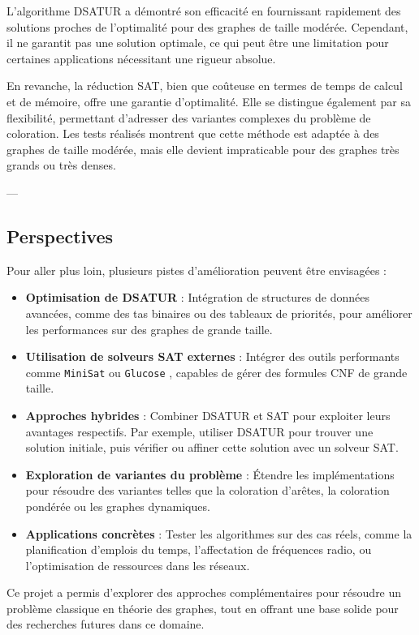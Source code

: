 \documentclass[11pt]{article}
\begin{document}
L'algorithme DSATUR a démontré son efficacité en fournissant rapidement des solutions proches de l'optimalité pour des graphes de taille modérée. Cependant, il ne garantit pas une solution optimale, ce qui peut être une limitation pour certaines applications nécessitant une rigueur absolue.

En revanche, la réduction SAT, bien que coûteuse en termes de temps de calcul et de mémoire, offre une garantie d'optimalité. Elle se distingue également par sa flexibilité, permettant d'adresser des variantes complexes du problème de coloration. Les tests réalisés montrent que cette méthode est adaptée à des graphes de taille modérée, mais elle devient impraticable pour des graphes très grands ou très denses.

---

\subsection{Perspectives}

Pour aller plus loin, plusieurs pistes d'amélioration peuvent être envisagées :
\begin{itemize}
    \item \textbf{Optimisation de DSATUR} : Intégration de structures de données avancées, comme des tas binaires ou des tableaux de priorités, pour améliorer les performances sur des graphes de grande taille.
    \item \textbf{Utilisation de solveurs SAT externes} : Intégrer des outils performants comme \texttt{MiniSat} ou \texttt{Glucose} \cite{sat_glucose} , capables de gérer des formules CNF de grande taille.
    \item \textbf{Approches hybrides} : Combiner DSATUR et SAT pour exploiter leurs avantages respectifs. Par exemple, utiliser DSATUR pour trouver une solution initiale, puis vérifier ou affiner cette solution avec un solveur SAT.
    \item \textbf{Exploration de variantes du problème} : Étendre les implémentations pour résoudre des variantes telles que la coloration d'arêtes, la coloration pondérée ou les graphes dynamiques.
    \item \textbf{Applications concrètes} : Tester les algorithmes sur des cas réels, comme la planification d'emplois du temps, l'affectation de fréquences radio, ou l'optimisation de ressources dans les réseaux.
\end{itemize}

Ce projet a permis d'explorer des approches complémentaires pour résoudre un problème classique en théorie des graphes, tout en offrant une base solide pour des recherches futures dans ce domaine.
\end{document}

